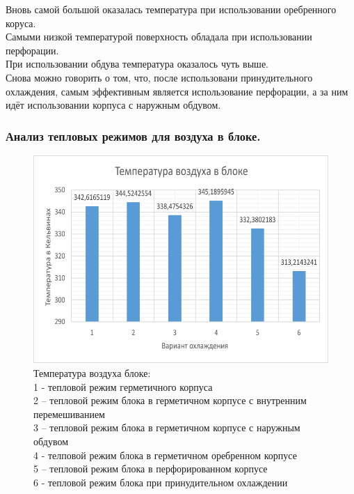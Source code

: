 Вновь самой большой оказалась температура при использовании оребренного коруса.\\

Самыми низкой температурой поверхность обладала при использовании
перфорации.\\

При использовании обдува температура оказалось чуть выше.\\

Снова можно говорить о том, что,
после использовани принудительного
охлаждения,
самым эффективным является использование перфорации,
а за ним идёт использовании корпуса с наружным обдувом.

\subsubsection{Анализ тепловых режимов для воздуха в блоке.}
\begin{figure}[h] %
\begin{center}
  \includegraphics[scale = 0.4]{images2/t_air.png}
  \end{center}
\caption{Температура воздуха блоке:\\
  1 - тепловой режим герметичного корпуса\\
  2 – тепловой режим блока в герметичном корпусе с внутренним перемешиванием\\
  3 – тепловой режим блока в герметичном корпусе с наружным обдувом\\
  4 - телповой режим блока в  герметичном оребренном корпусе \\
  5 – тепловой режим блока в перфорированном корпусе \\
  6 - тепловой режим блока при принудительном охлаждении}

\end{figure}

